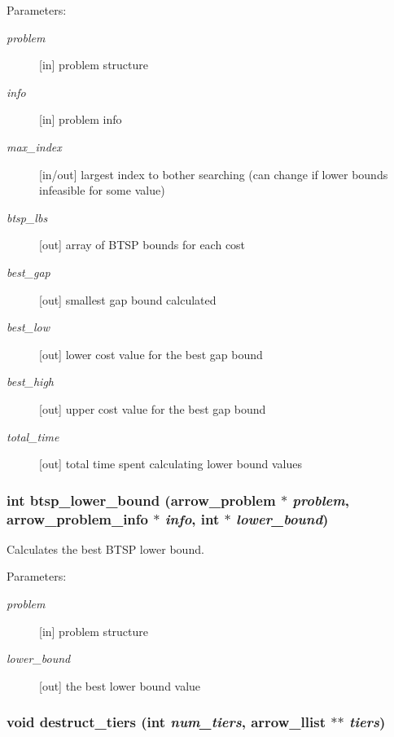 \begin{Desc}
\item[Parameters:]
\begin{description}
\item[{\em problem}]\mbox{[}in\mbox{]} problem structure \item[{\em info}]\mbox{[}in\mbox{]} problem info \item[{\em max\_\-index}]\mbox{[}in/out\mbox{]} largest index to bother searching (can change if lower bounds infeasible for some value) \item[{\em btsp\_\-lbs}]\mbox{[}out\mbox{]} array of BTSP bounds for each cost \item[{\em best\_\-gap}]\mbox{[}out\mbox{]} smallest gap bound calculated \item[{\em best\_\-low}]\mbox{[}out\mbox{]} lower cost value for the best gap bound \item[{\em best\_\-high}]\mbox{[}out\mbox{]} upper cost value for the best gap bound \item[{\em total\_\-time}]\mbox{[}out\mbox{]} total time spent calculating lower bound values \end{description}
\end{Desc}
\hypertarget{lib_2baltsp_2baltsp-lb_8c_90a22293c99499a2da22fd0d1a16acb4}{
\subsubsection[{btsp\_\-lower\_\-bound}]{\setlength{\rightskip}{0pt plus 5cm}int btsp\_\-lower\_\-bound ({\bf arrow\_\-problem} $\ast$ {\em problem}, \/  {\bf arrow\_\-problem\_\-info} $\ast$ {\em info}, \/  int $\ast$ {\em lower\_\-bound})}}
\label{lib_2baltsp_2baltsp-lb_8c_90a22293c99499a2da22fd0d1a16acb4}


Calculates the best BTSP lower bound. 

\begin{Desc}
\item[Parameters:]
\begin{description}
\item[{\em problem}]\mbox{[}in\mbox{]} problem structure \item[{\em lower\_\-bound}]\mbox{[}out\mbox{]} the best lower bound value \end{description}
\end{Desc}
\hypertarget{lib_2baltsp_2baltsp-lb_8c_086f8eb237774105f487040ef6ac62df}{
\subsubsection[{destruct\_\-tiers}]{\setlength{\rightskip}{0pt plus 5cm}void destruct\_\-tiers (int {\em num\_\-tiers}, \/  {\bf arrow\_\-llist} $\ast$$\ast$ {\em tiers})}}
\label{lib_2baltsp_2baltsp-lb_8c_086f8eb237774105f487040ef6ac62df}


